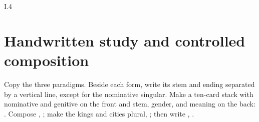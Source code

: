 \begin{courseunit}{I.4}
\section{Handwritten study and controlled composition}

Copy the three paradigms. Beside each form, write its stem and ending separated
by a vertical line, except for the nominative singular. Make a ten-card stack
with nominative and genitive on the front and stem, gender, and meaning on the
back: . Compose , ; make the kings and cities plural, ;
then write , .



\end{courseunit}


